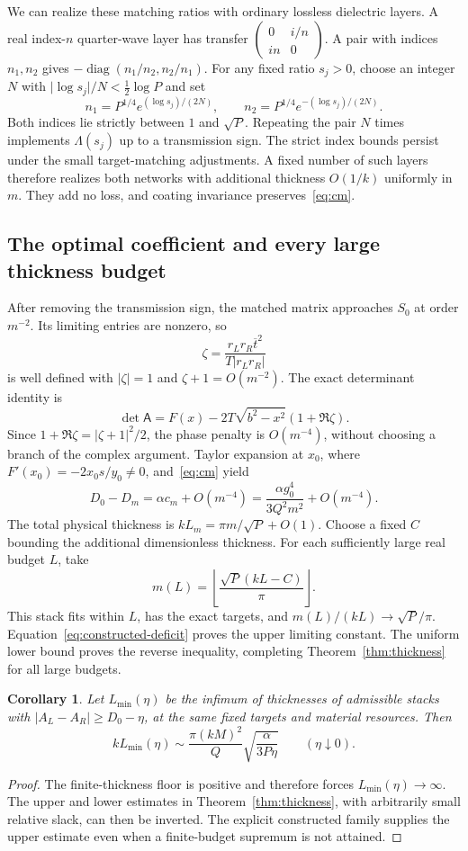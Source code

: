 \documentclass[11pt,a4paper]{article}
\newtheorem{corollary}[theorem]{Corollary}
\theoremstyle{remark}
\newcommand{\abs}[1]{\lvert #1\rvert}
\newcommand{\diag}{\operatorname{diag}}
\begin{document}
We can realize these matching ratios with ordinary lossless dielectric layers. A real index-$n$ quarter-wave layer has transfer $\left(\begin{smallmatrix}0&i/n\\in&0\end{smallmatrix}\right)$. A pair with indices $n_1,n_2$ gives $-\diag(n_1/n_2,n_2/n_1)$. For any fixed ratio $s_j>0$, choose an integer $N$ with $\abs{\log s_j}/N<\tfrac12\log P$ and set
\[
 n_1=P^{1/4}e^{(\log s_j)/(2N)},\qquad
 n_2=P^{1/4}e^{-(\log s_j)/(2N)}.
\]
Both indices lie strictly between $1$ and $\sqrt P$. Repeating the pair $N$ times implements $\Lambda(s_j)$ up to a transmission sign. The strict index bounds persist under the small target-matching adjustments. A fixed number of such layers therefore realizes both networks with additional thickness $O(1/k)$ uniformly in $m$. They add no loss, and coating invariance preserves~\eqref{eq:cm}.

\subsection{The optimal coefficient and every large thickness budget}
After removing the transmission sign, the matched matrix approaches $S_0$ at order $m^{-2}$. Its limiting entries are nonzero, so
\[
 \zeta=\frac{r_Lr_R\overline{t}^{2}}{T\abs{r_Lr_R}}
\]
is well defined with $\abs\zeta=1$ and $\zeta+1=O(m^{-2})$. The exact determinant identity is
\[
 \det\mathsf A=F(x)-2T\sqrt{b^2-x^2}(1+\Re\zeta).
\]
Since $1+\Re\zeta=\abs{\zeta+1}^2/2$, the phase penalty is $O(m^{-4})$, without choosing a branch of the complex argument. Taylor expansion at $x_0$, where $F'(x_0)=-2x_0s/y_0\ne0$, and~\eqref{eq:cm} yield
\begin{equation}\label{eq:constructed-deficit}
 D_0-D_m=\alpha c_m+O(m^{-4})
 =\frac{\alpha g_0^4}{3Q^2m^2}+O(m^{-4}).
\end{equation}
The total physical thickness is $kL_m=\pi m/\sqrt P+O(1)$. Choose a fixed $C$ bounding the additional dimensionless thickness. For each sufficiently large real budget $L$, take
\[
 m(L)=\left\lfloor\frac{\sqrt P(kL-C)}\pi\right\rfloor.
\]
This stack fits within $L$, has the exact targets, and $m(L)/(kL)\to\sqrt P/\pi$. Equation~\eqref{eq:constructed-deficit} proves the upper limiting constant. The uniform lower bound proves the reverse inequality, completing Theorem~\ref{thm:thickness} for all large budgets.

\begin{corollary}\label{cor:min-thickness}
Let $L_{\min}(\eta)$ be the infimum of thicknesses of admissible stacks with $\abs{A_L-A_R}\geq D_0-\eta$, at the same fixed targets and material resources. Then
\[
 kL_{\min}(\eta)\sim\frac{\pi(kM)^2}{Q}\sqrt{\frac\alpha{3P\eta}}
 \qquad(\eta\downarrow0).
\]
\end{corollary}
\begin{proof}
The finite-thickness floor is positive and therefore forces $L_{\min}(\eta)\to\infty$. The upper and lower estimates in Theorem~\ref{thm:thickness}, with arbitrarily small relative slack, can then be inverted. The explicit constructed family supplies the upper estimate even when a finite-budget supremum is not attained.
\end{proof}
\end{document}
